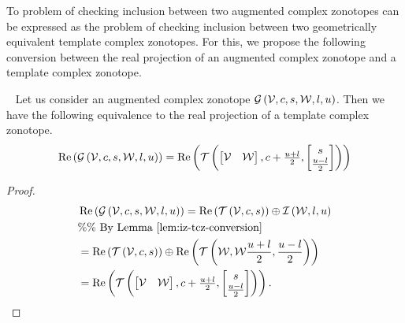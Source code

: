 %
To problem of checking inclusion between two augmented complex
zonotopes can be expressed as the problem of checking
inclusion between two geometrically equivalent template complex
zonotopes.  For this, we propose the following conversion between the
real projection of an augmented complex zonotope and a template
complex zonotope.
%
\begin{lemma}~\label{lem:acz-tcz-conversion}
Let us consider an augmented complex zonotope
$\mathcal{G}\left(\mathcal{V},c,s,\mathcal{W},l,u\right)$.  Then we have the
following equivalence to the real projection of a template complex zonotope.
%
\begin{align*}
  \operatorname{Re}\left(\mathcal{G}\left(\mathcal{V},c,s,\mathcal{W},l,u\right)\right)
  = \operatorname{Re}\left(\mathit{\operatorname{\mathcal{T}}}\left(\left[\begin{matrix}
      \mathcal{V} &
      \mathcal{W}
    \end{matrix}\right]
  ,\begin{matrix}
      c+\frac{u+l}{2}
    \end{matrix}
  ,\left[\begin{matrix}
      s\\
      \frac{u-l}{2}
    \end{matrix}\right]
  \right)
  \right)
\end{align*}
%
\end{lemma}
%
\begin{proof}
  \begin{align*}
    & \operatorname{Re}\left(\mathcal{G}\left(\mathcal{V},c,s,\mathcal{W},l,u\right)\right)
    =
    \operatorname{Re}\left(\mathit{\operatorname{\mathcal{T}}}\left(\mathcal{V},c,s\right)\right)\oplus\mathit{\operatorname{\mathcal{I}}}\left(\mathcal{W},l,u\right)\\
    & \%\%~\text{By Lemma~\ref{lem:iz-tcz-conversion}}\\
    & =
    \operatorname{Re}\left(\mathit{\operatorname{\mathcal{T}}}\left(\mathcal{V},c,s\right)\right)\oplus\operatorname{Re}\left(\mathit{\operatorname{\mathcal{T}}}\left(\mathcal{W},\mathcal{W}\frac{u+l}{2},\frac{u-l}{2}\right)\right)\\
    &
  = \operatorname{Re}\left(\mathit{\operatorname{\mathcal{T}}}\left(\left[\begin{matrix}
      \mathcal{V} &
      \mathcal{W}
    \end{matrix}\right]
  ,\begin{matrix}
      c+\frac{u+l}{2}
    \end{matrix}
  ,\left[\begin{matrix}
      s\\
      \frac{u-l}{2}
    \end{matrix}\right]
  \right)
  \right).\hspace{4em}\qedhere
   \end{align*}
\end{proof}
